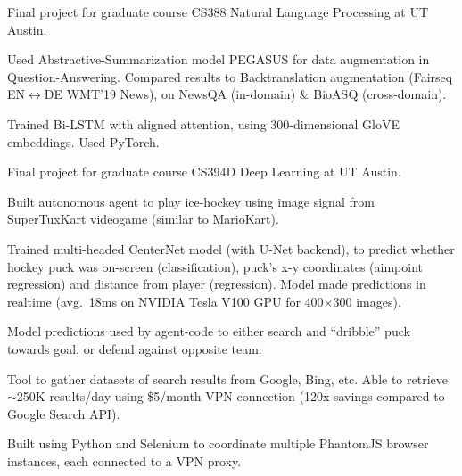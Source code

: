 \documentclass[]{deedy-resume-openfont}
\begin{document}


\subsubsectionsep
Final project for graduate course CS388 Natural Language Processing at UT Austin.
\begin{tightemize}
    \item Used Abstractive-Summarization model PEGASUS for data augmentation in Question-Answering. Compared results to Backtranslation augmentation (Fairseq EN$\leftrightarrow$DE WMT'19 News), on NewsQA (in-domain) \& BioASQ (cross-domain).
    \item Trained Bi-LSTM with aligned attention, using 300-dimensional GloVE embeddings. Used PyTorch.
\end{tightemize}
\sectionsep

Final project for graduate course CS394D Deep Learning at UT Austin.
\begin{tightemize}
    \item Built autonomous agent to play ice-hockey using image signal from SuperTuxKart videogame (similar to MarioKart). 
    \item Trained multi-headed CenterNet model (with U-Net backend), to predict whether hockey puck was on-screen (classification), puck's x-y coordinates (aimpoint regression) and distance from player (regression). Model made predictions in realtime \mbox{(avg. 18ms} on NVIDIA Tesla V100 GPU for 400$\times$300 images).
    \item Model predictions used by agent-code to either search and ``dribble'' puck towards goal, or defend against opposite team.
\end{tightemize}
\sectionsep


\begin{tightemize}
    \item Tool to gather datasets of search results from Google, Bing, etc. Able to retrieve $\sim$250K results/day using \$5/month VPN connection (120x savings compared to Google Search API).
    \item Built using Python and Selenium to coordinate multiple PhantomJS browser instances, each connected to a VPN proxy.
\end{tightemize}
\end{document}
